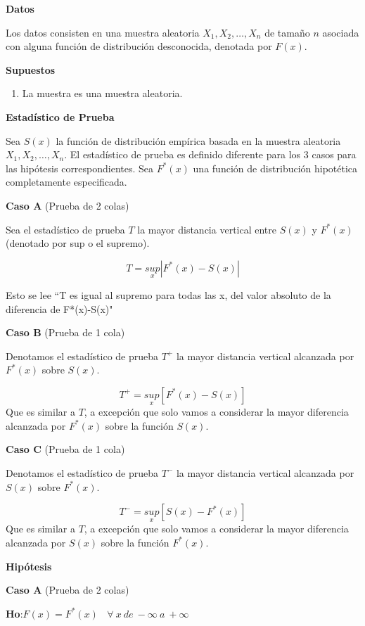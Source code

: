 \documentclass[a4paper,oneside,openany]{book}
\providecommand{\tightlist}{%
  \setlength{\itemsep}{0pt}\setlength{\parskip}{0pt}}
\begin{document}
\textbf{Datos}

Los datos consisten en una muestra aleatoria
\(X_{1},X_{2},\ldots,X_{n}\) de tamaño \(n\) asociada con alguna función
de distribución desconocida, denotada por \(F(x)\).

\textbf{Supuestos}

\begin{enumerate}
\def\labelenumi{\arabic{enumi})}
\tightlist
\item
  La muestra es una muestra aleatoria.
\end{enumerate}

\textbf{Estadístico de Prueba}

Sea \(S(x)\) la función de distribución empírica basada en la muestra
aleatoria \(X_{1},X_{2},\ldots,X_{n}\). El estadístico de prueba es
definido diferente para los 3 casos para las hipótesis correspondientes.
Sea \(F^*(x)\) una función de distribución hipotética completamente
especificada.

\textbf{Caso A }(Prueba de 2 colas)

Sea el estadístico de prueba \(T\) la mayor distancia vertical entre
\(S(x)\) y \(F^*(x)\)(denotado por sup o el supremo).

\[T=\underset{x}{sup}|F^*(x)-S(x)|\]

Esto se lee ``T es igual al supremo para todas las x, del valor absoluto
de la diferencia de F*(x)-S(x)"

\textbf{Caso B }(Prueba de 1 cola)

Denotamos el estadístico de prueba \(T^+\) la mayor distancia vertical
alcanzada por \(F^*(x)\) sobre \(S(x)\).

\[T^+=\underset{x}{sup}[F^*(x)-S(x)] \] Que es similar a \(T\), a
excepción que solo vamos a considerar la mayor diferencia alcanzada por
\(F^*(x)\) sobre la función \(S(x)\).

\textbf{Caso C }(Prueba de 1 cola)

Denotamos el estadístico de prueba \(T^-\) la mayor distancia vertical
alcanzada por \(S(x)\) sobre \(F^*(x)\).

\[T^-=\underset{x}{sup}[S(x)-F^*(x)] \] Que es similar a \(T\), a
excepción que solo vamos a considerar la mayor diferencia alcanzada por
\(S(x)\) sobre la función \(F^*(x)\).

\textbf{Hipótesis}

\textbf{Caso A} (Prueba de 2 colas)

\textbf{Ho}:\(F(x)=F^*(x) \ \ \ \ \forall\ x\  de\ -\infty \ a\  +\infty\)
\end{document}

